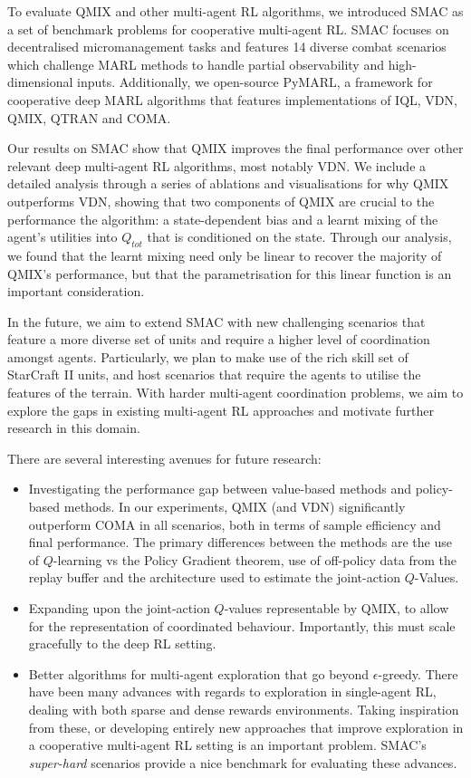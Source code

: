 \documentclass[twoside,11pt]{article}
\begin{document}
To evaluate QMIX and other multi-agent RL algorithms, we introduced SMAC as a set of benchmark problems for cooperative multi-agent RL.
SMAC focuses on decentralised
micromanagement tasks and features 14 diverse combat scenarios which challenge
MARL methods to handle partial observability and high-dimensional inputs. Additionally, we
open-source PyMARL, a framework for cooperative deep MARL algorithms that features implementations of IQL, VDN, QMIX, QTRAN and COMA.

Our results on SMAC show that QMIX improves the final performance over other relevant deep multi-agent RL algorithms, most notably VDN. 
We include a detailed analysis through a series of ablations and visualisations for why QMIX outperforms VDN, showing that two components of QMIX are crucial to the performance the algorithm: a state-dependent bias and a learnt mixing of the agent's utilities into $Q_{tot}$ that is conditioned on the state.
Through our analysis, we found that the learnt mixing need only be linear to recover the majority of QMIX's performance, but that the parametrisation for this linear function is an important consideration.

In the future, we aim to extend SMAC with new challenging scenarios that
feature a more diverse set of units and require a higher level of coordination
amongst agents. Particularly, we plan to make use of the rich skill set of
StarCraft II units, and host scenarios that require the agents to utilise the
features of the terrain. With harder multi-agent coordination problems, we aim to explore the
gaps in existing multi-agent RL approaches and motivate further research in this domain.

There are several interesting avenues for future research:
\begin{itemize}
	\item Investigating the performance gap between value-based methods and policy-based methods. 
	In our experiments, QMIX (and VDN) significantly outperform COMA in all scenarios, both in terms of sample efficiency and final performance. The primary differences between the methods are the use of $Q$-learning vs the Policy Gradient theorem, use of off-policy data from the replay buffer and the architecture used to estimate the joint-action $Q$-Values.
	\item Expanding upon the joint-action $Q$-values representable by QMIX, to allow for the representation of coordinated behaviour. Importantly, this must scale gracefully to the deep RL setting.
	\item Better algorithms for multi-agent exploration that go beyond $\epsilon$-greedy. There have been many advances with regards to exploration in single-agent RL, dealing with both sparse and dense rewards environments. Taking inspiration from these, or developing entirely new approaches that improve exploration in a cooperative multi-agent RL setting is an important problem. SMAC's \textit{super-hard} scenarios provide a nice benchmark for evaluating these advances. 
\end{itemize}
\end{document}
